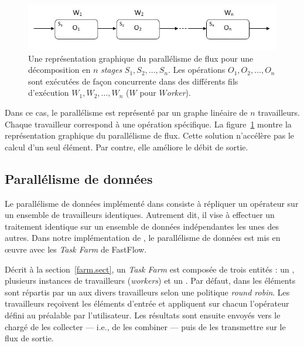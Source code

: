 \begin{figure}[ht]
\centering
     \includegraphics[width=1.0\textwidth]{Figures/ParallelismeDuFlux.jpg}
      \caption[Une repr\'esentation graphique du parall\'elisme de flux.]{Une repr\'esentation graphique du parall\'elisme de flux pour une d\'ecomposition en $n$ \emph{stages} $S_1, S_2, \ldots, S_n$. Les op\'erations $O_1, O_2, \ldots, O_n$ sont ex\'ecut\'ees de fa\c{c}on concurrente dans des diff\'erents fils d'ex\'ecution $W_1, W_2, \ldots, W_n$ ($W$ pour \emph{$W$orker}).}
       \label{ParallelismeDuFlux.fig}
\end{figure}


Dans ce cas, le parall\'elisme est repr\'esent\'e par un graphe lin\'eaire de $n$ travailleurs. Chaque travailleur correspond \`a une op\'eration sp\'ecifique. La figure~\ref{ParallelismeDuFlux.fig} montre la repr\'esentation graphique du parall\'elisme de flux. Cette solution n'acc\'el\`ere pas le calcul d'un seul \'el\'ement. Par contre, elle am\'eliore le d\'ebit de sortie.

\subsection{Parall\'elisme de donn\'ees}

Le parall\'elisme de donn\'ees impl\'ement\'e dans   consiste \`a r\'epliquer un op\'erateur sur un ensemble de travailleurs identiques. Autrement dit, il vise \`a effectuer un traitement identique sur un ensemble de donn\'ees ind\'ependantes les unes des autres. 
%
Dans notre impl\'ementation de \PpFf, le parall\'elisme de donn\'ees est mis en \oe{}uvre avec les \emph{Task Farm} de FastFlow.


D\'ecrit \`a la section~\ref{farm.sect}, un \emph{Task Farm} est compos\'ee de trois entit\'es : un , plusieurs instances de travailleurs (\emph{workers}) et un . Par d\'efaut, dans \PpFf{} les \'el\'ements sont r\'epartis par un  aux divers travailleurs selon une politique \emph{round robin}. Les travailleurs re\c{c}oivent les \'el\'ements d'entr\'ee et appliquent sur chacun l'op\'erateur d\'efini au pr\'ealable par l'utilisateur. Les r\'esultats sont ensuite envoy\'es vers le  charg\'e de les collecter --- i.e., de les combiner --- puis de les transmettre sur le flux de sortie.

